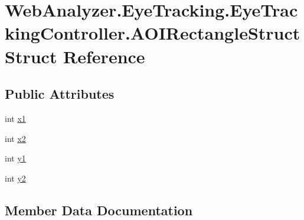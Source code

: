 \hypertarget{struct_web_analyzer_1_1_eye_tracking_1_1_eye_tracking_controller_1_1_a_o_i_rectangle_struct}{}\section{Web\+Analyzer.\+Eye\+Tracking.\+Eye\+Tracking\+Controller.\+A\+O\+I\+Rectangle\+Struct Struct Reference}
\label{struct_web_analyzer_1_1_eye_tracking_1_1_eye_tracking_controller_1_1_a_o_i_rectangle_struct}
\subsection*{Public Attributes}
\begin{DoxyCompactItemize}
\item 
int \hyperlink{struct_web_analyzer_1_1_eye_tracking_1_1_eye_tracking_controller_1_1_a_o_i_rectangle_struct_a61050b2bde6a0cd57aa54ef04fc12bd7}{x1}
\item 
int \hyperlink{struct_web_analyzer_1_1_eye_tracking_1_1_eye_tracking_controller_1_1_a_o_i_rectangle_struct_ace38fb764016eccbd2cbd689810b580c}{x2}
\item 
int \hyperlink{struct_web_analyzer_1_1_eye_tracking_1_1_eye_tracking_controller_1_1_a_o_i_rectangle_struct_a3da5745e9d6fa4c48c487c9f53363e29}{y1}
\item 
int \hyperlink{struct_web_analyzer_1_1_eye_tracking_1_1_eye_tracking_controller_1_1_a_o_i_rectangle_struct_a6a8077e37dbbe0209d058b8d8dde3e46}{y2}
\end{DoxyCompactItemize}


\subsection{Member Data Documentation}
\hypertarget{struct_web_analyzer_1_1_eye_tracking_1_1_eye_tracking_controller_1_1_a_o_i_rectangle_struct_a61050b2bde6a0cd57aa54ef04fc12bd7}{}
